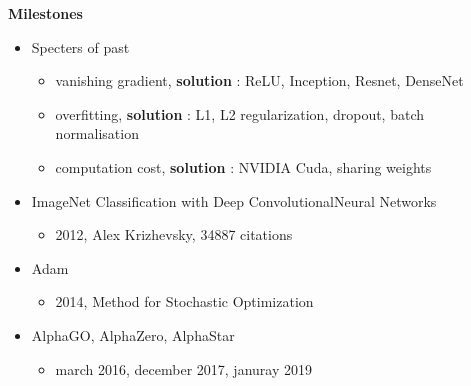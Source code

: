 \documentclass[xcolor=dvipsnames]{beamer}
\begin{document}
\begin{frame}{\bf Milestones}

{ \footnotesize
    \begin{itemize}
        \item Specters of past
            \begin{itemize}
                \item vanishing gradient, {\bf solution} : ReLU, Inception, Resnet, DenseNet
                \item overfitting, {\bf solution} : L1, L2 regularization, dropout, batch normalisation
                \item computation cost, {\bf solution} : NVIDIA Cuda, sharing weights
            \end{itemize}
        \item ImageNet Classification with Deep ConvolutionalNeural Networks \footnotemark
            \begin{itemize}
                \item 2012, Alex Krizhevsky, 34887 citations
            \end{itemize}
        \item Adam
            \begin{itemize}
                \item 2014,  Method for Stochastic Optimization \footnotemark
            \end{itemize}
        \item AlphaGO, AlphaZero, AlphaStar \footnotemark
            \begin{itemize}
                \item march 2016, december 2017, januray 2019
            \end{itemize}
    \end{itemize}
}



\end{frame}
\end{document}
